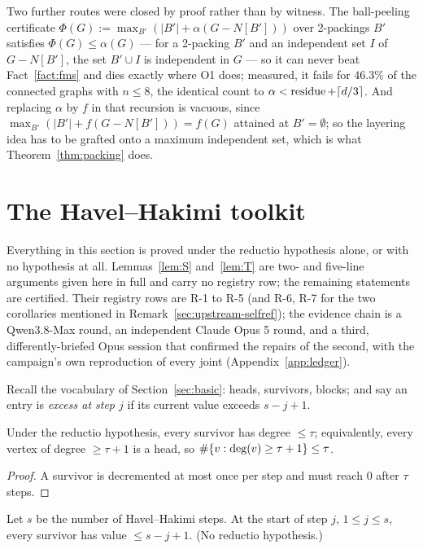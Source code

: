 Two further routes were closed by proof rather than by witness. The ball-peeling
certificate $\Phi(G) := \max_{B'} (|B'| + \alpha(G - N[B']))$ over 2-packings $B'$ satisfies
$\Phi(G) \le \alpha(G)$ --- for a 2-packing $B'$ and an independent set $I$ of $G - N[B']$,
the set $B' \cup I$ is independent in $G$ --- so it can never beat Fact~\ref{fact:fms} and
dies exactly where O1 does; measured, it fails for $46.3\%$ of the connected graphs with
$n \le 8$, the identical count to $\alpha < \operatorname{residue} + \lceil d/3 \rceil$. And replacing
$\alpha$ by $f$ in that recursion is vacuous, since
$\max_{B'}(|B'| + f(G - N[B'])) = f(G)$ attained at $B' = \emptyset$; so the layering idea
has to be grafted onto a maximum independent set, which is what
Theorem~\ref{thm:packing} does.

\section{The Havel--Hakimi toolkit}\label{sec:toolkit}

Everything in this section is proved under the reductio hypothesis alone, or with no
hypothesis at all. Lemmas~\ref{lem:S} and~\ref{lem:T} are two- and five-line arguments given
here in full and carry no registry row; the remaining statements are certified. Their
registry rows are R-1 to R-5 (and R-6,
R-7 for the two corollaries mentioned in Remark~\ref{sec:upstream-selfref}); the evidence chain is a
Qwen3.8-Max round, an independent Claude Opus 5 round, and a third, differently-briefed
Opus session that confirmed the repairs of the second, with the campaign's own
reproduction of every joint (Appendix~\ref{app:ledger}).

Recall the vocabulary of Section~\ref{sec:basic}: heads, survivors, blocks; and say an
entry is \emph{excess at step $j$} if its current value exceeds $s - j + 1$.

\begin{lemma}\label{lem:S}
\Selem
Under the reductio hypothesis, every survivor has degree $\le \tau$; equivalently, every
vertex of degree $\ge \tau+1$ is a head, so $\#\{v : \mathrm{deg}(v) \ge \tau+1\} \le \tau$.
\end{lemma}

\begin{proof}
A survivor is decremented at most once per step and must reach $0$ after $\tau$ steps.
\end{proof}

\begin{lemma}\label{lem:F3prime}
Let $s$ be the number of Havel--Hakimi steps. At the start of step $j$, $1 \le j \le s$,
every survivor has value $\le s - j + 1$. \textup{(}No reductio hypothesis.\textup{)}
\end{lemma}

